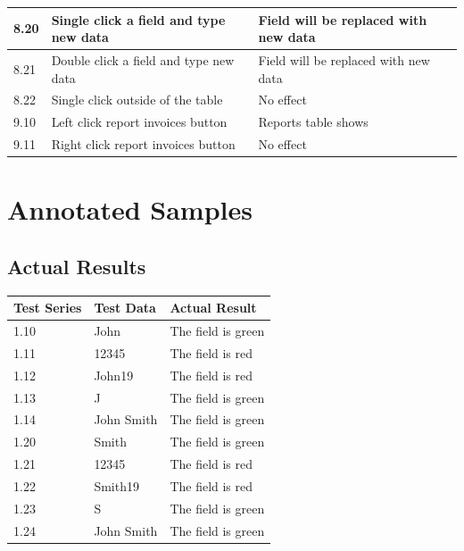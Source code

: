 \begin{landscape}
\begin{center}
\begin{longtable}{|p{2cm}|p{5cm}|p{8cm}|}
       \rowcolor{lightgrey} 8.20 & Single click a field and type new data & Field will be replaced with new data \\ \hline
       \rowcolor{lightgrey} 8.21 & Double click a field and type new data & Field will be replaced with new data \\ \hline
       \rowcolor{lightgrey} 8.22 & Single click outside of the table & No effect \\ \hline

       \rowcolor{lightgrey} 9.10 & Left click report invoices button & Reports table shows \\ \hline
       \rowcolor{lightgrey} 9.11 & Right click report invoices button & No effect \\ \hline

    \end{longtable}
\end{center}

\section{Annotated Samples}

\subsection{Actual Results}

\begin{center}
    \begin{longtable}{|p{2cm}|p{5cm}|p{8cm}|}
        \hline
        \textbf{Test Series} & \textbf{Test Data} & \textbf{Actual Result}\\ \hline
        1.10 & John & The field is green \\ \hline
        1.11 & 12345 &  The field is red \\ \hline
        1.12 & John19 &  The field is red \\ \hline
        1.13 & J &  The field is green \\ \hline
        1.14 & John Smith & The field is green \\ \hline
        
        1.20 & Smith &  The field is green \\ \hline
        1.21 & 12345 &   The field is red \\ \hline
        1.22 & Smith19 &  The field is red \\ \hline
        1.23 & S &  The field is green \\ \hline
        1.24 & John Smith & The field is green \\ \hline
        

\end{longtable}
\end{center}
\end{landscape}
